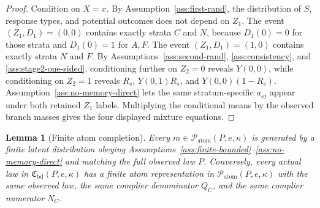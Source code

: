 \documentclass[11pt]{article}
\theoremstyle{definition}
\theoremstyle{plain}
\newtheorem{lemma}{Lemma}
\theoremstyle{remark}
\begin{document}
\begin{proof}
Condition on \(X=x\).
By Assumption~\ref{ass:first-rand}, the distribution of \(S\), response types, and potential outcomes does not depend on \(Z_1\).
The event \((Z_1,D_1)=(0,0)\) contains exactly strata \(C\) and \(N\), because \(D_1(0)=0\) for those strata and \(D_1(0)=1\) for \(A,F\).
The event \((Z_1,D_1)=(1,0)\) contains exactly strata \(N\) and \(F\).
By Assumptions~\ref{ass:second-rand}, \ref{ass:consistency}, and \ref{ass:stage2-one-sided}, conditioning further on \(Z_2=0\) reveals \(Y(0,0)\), while conditioning on \(Z_2=1\) reveals \(R_s\), \(Y(0,1)R_s\), and \(Y(0,0)(1-R_s)\).
Assumption~\ref{ass:no-memory-direct} lets the same stratum-specific \(a_{sj}\) appear under both retained \(Z_1\) labels.
Multiplying the conditional means by the observed branch masses gives the four displayed mixture equations.
\end{proof}

\begin{lemma}[Finite atom completion]\label{lem:completion}
Every \(m\in\mathcal P_{\mathrm{atom}}(P,e,\kappa)\) is generated by a finite latent distribution obeying Assumptions~\ref{ass:finite-bounded}--\ref{ass:no-memory-direct} and matching the full observed law \(P\).
Conversely, every actual law in \(\mathfrak C_{\mathrm{bd}}(P,e,\kappa)\) has a finite atom representation in \(\mathcal P_{\mathrm{atom}}(P,e,\kappa)\) with the same observed law, the same complier denominator \(Q_C\), and the same complier numerator \(N_C\).
\end{lemma}
\end{document}

